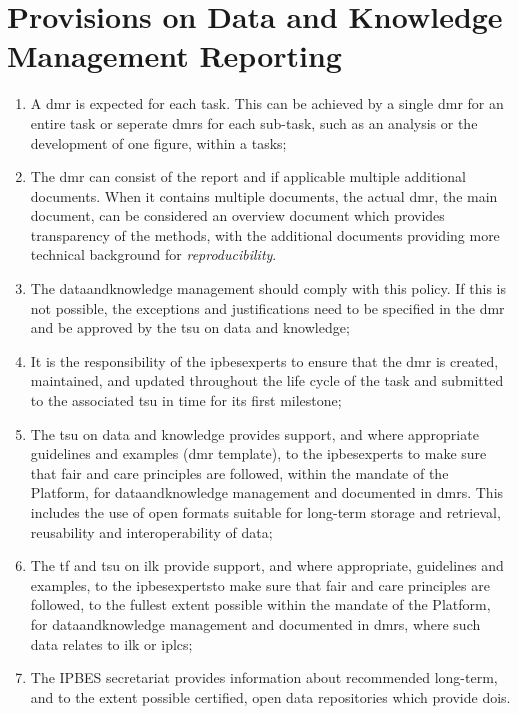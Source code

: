 \documentclass{article}
\begin{document}
\section{Provisions on Data and Knowledge Management Reporting}


\begin{enumerate}[label=(\alph*)]
    \item A \gls{dmr} is expected for each \gls{task}. This can be achieved by a single \gls{dmr} for an entire \gls{task} or seperate \glspl{dmr} for each sub-\gls{task}, such as an analysis or the development of one figure, within a \glspl{task};

    \item The \gls{dmr} can consist of the report and if applicable multiple additional documents. When it contains multiple documents, the actual \gls{dmr}, the main document, can be considered an overview document which provides transparency of the methods, with the additional documents providing more technical background for \textit{reproducibility}.

    \item The \gls{dataandknowledge} management should comply with this policy. If this is not possible, the exceptions and justifications need to be specified in the \gls{dmr} and be approved by the  \gls{tsu} on data and knowledge;

    \item It is the responsibility of the \glspl{ipbesexpert} to ensure that the \gls{dmr} is created, maintained, and updated throughout the life cycle of the \gls{task} and submitted to the associated \gls{tsu} in time for its first \gls{milestone};

    \item The  \gls{tsu} on \gls{data} and \gls{knowledge} provides support, and where appropriate guidelines and examples (\gls{dmr}  template), to the \glspl{ipbesexpert} to make sure that \gls{fair} and \gls{care} principles are followed, within the mandate of the Platform, for \gls{dataandknowledge} management and documented in \glspl{dmr}. This includes the use of open formats suitable for long-term storage and retrieval, reusability and interoperability of \gls{data};

    \item The \gls{tf} and \gls{tsu} on \gls{ilk} provide support, and where appropriate, guidelines and examples, to the \glspl{ipbesexpert}to make sure that \gls{fair} and \gls{care} principles are followed, to the fullest extent possible within the mandate of the Platform, for \gls{dataandknowledge} management and documented in \glspl{dmr}, where such \gls{data} relates to \gls{ilk} or \glspl{iplc};

    \item The IPBES \gls{secretariat} provides information about recommended long-term, and to the extent possible certified, open \gls{data} repositories which provide \glspl{doi}.
\end{enumerate}
\end{document}
